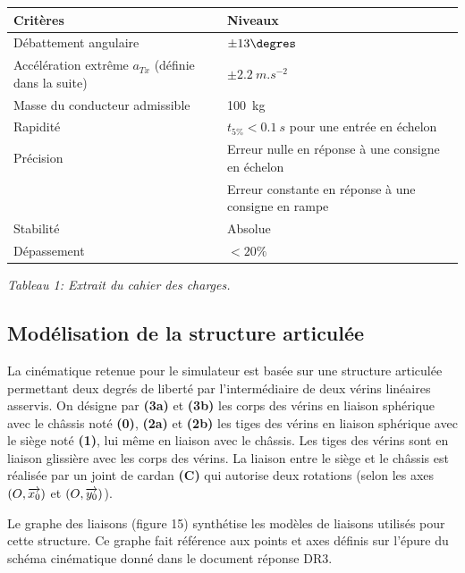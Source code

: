 \documentclass[10pt,fleqn]{article} %
\begin{document}
\begin{center}
\begin{tabular}{|l|l|}
\hline
Critères & Niveaux \\ \hline
Débattement angulaire & $\pm 13\degres$ \\ \hline
Accélération extrême $a_{Tx}$ (définie dans la suite)& $\pm \SI{2,2}{m.s^{-2}}$ \\ \hline
 Masse du conducteur admissible & \SI{100}{kg} \\ \hline
Rapidité & $t_{5\%} < \SI{0,1}{s}$ pour une entrée en échelon \\ \hline
Précision& Erreur nulle en réponse à une consigne en échelon \\ 
& Erreur constante en réponse à une consigne en rampe \\ \hline
Stabilité & Absolue \\ \hline
Dépassement 	& $< 20\%$ \\ \hline
\end{tabular}

\textit{Tableau 1: Extrait du cahier des charges.}
\end{center}

\subsection{Modélisation de la structure articulée}
La cinématique retenue pour le simulateur est basée sur une structure articulée permettant deux degrés de liberté par l'intermédiaire de deux vérins linéaires asservis. On désigne par \textbf{(3a)} et \textbf{(3b)} les corps des vérins en liaison sphérique avec le châssis noté \textbf{(0)}, \textbf{(2a)} et \textbf{(2b)} les tiges des vérins en liaison sphérique avec le siège noté \textbf{(1)}, lui même en liaison avec le châssis. Les tiges des vérins sont en liaison glissière avec les corps des vérins. La liaison entre le siège et le châssis est réalisée par un joint de cardan \textbf{(C)} qui autorise deux rotations (selon les axes $\left(O,\overrightarrow{x_0}\right)$ et $\left(O,\overrightarrow{y_0}\right)$). 

Le graphe des liaisons (figure 15) synthétise les modèles de liaisons utilisés pour cette structure. Ce graphe fait référence aux points et axes définis sur l'épure du schéma cinématique donné dans le document réponse DR3.
\end{document}
